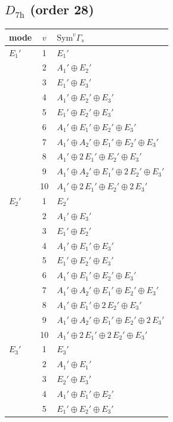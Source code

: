 \documentclass[11pt]{article}
\begin{document}
\subsection*{$D_{7\mathrm{h}}$ \quad (order 28)}
\begin{longtable}{l c p{}}
\hline mode & $v$ & $\mathrm{Sym}^v\Gamma_s$\\ \hline\endhead
$E_{1}'$ & 1 & $E_{1}'$\\
 & 2 & $A_{1}'\oplus E_{2}'$\\
 & 3 & $E_{1}'\oplus E_{3}'$\\
 & 4 & $A_{1}'\oplus E_{2}'\oplus E_{3}'$\\
 & 5 & $E_{1}'\oplus E_{2}'\oplus E_{3}'$\\
 & 6 & $A_{1}'\oplus E_{1}'\oplus E_{2}'\oplus E_{3}'$\\
 & 7 & $A_{1}'\oplus A_{2}'\oplus E_{1}'\oplus E_{2}'\oplus E_{3}'$\\
 & 8 & $A_{1}'\oplus 2\,E_{1}'\oplus E_{2}'\oplus E_{3}'$\\
 & 9 & $A_{1}'\oplus A_{2}'\oplus E_{1}'\oplus 2\,E_{2}'\oplus E_{3}'$\\
 & 10 & $A_{1}'\oplus 2\,E_{1}'\oplus E_{2}'\oplus 2\,E_{3}'$\\
\hline
$E_{2}'$ & 1 & $E_{2}'$\\
 & 2 & $A_{1}'\oplus E_{3}'$\\
 & 3 & $E_{1}'\oplus E_{2}'$\\
 & 4 & $A_{1}'\oplus E_{1}'\oplus E_{3}'$\\
 & 5 & $E_{1}'\oplus E_{2}'\oplus E_{3}'$\\
 & 6 & $A_{1}'\oplus E_{1}'\oplus E_{2}'\oplus E_{3}'$\\
 & 7 & $A_{1}'\oplus A_{2}'\oplus E_{1}'\oplus E_{2}'\oplus E_{3}'$\\
 & 8 & $A_{1}'\oplus E_{1}'\oplus 2\,E_{2}'\oplus E_{3}'$\\
 & 9 & $A_{1}'\oplus A_{2}'\oplus E_{1}'\oplus E_{2}'\oplus 2\,E_{3}'$\\
 & 10 & $A_{1}'\oplus 2\,E_{1}'\oplus 2\,E_{2}'\oplus E_{3}'$\\
\hline
$E_{3}'$ & 1 & $E_{3}'$\\
 & 2 & $A_{1}'\oplus E_{1}'$\\
 & 3 & $E_{2}'\oplus E_{3}'$\\
 & 4 & $A_{1}'\oplus E_{1}'\oplus E_{2}'$\\
 & 5 & $E_{1}'\oplus E_{2}'\oplus E_{3}'$\\

\end{longtable}
\end{document}
